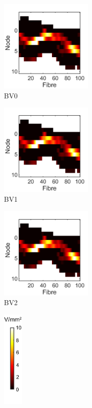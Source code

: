 \begin{figure}
	\centering
	
	\begin{subfigure}[t]{0.3\textwidth}
        \centering
        \includegraphics[height=4.5cm]{Simulations/Vasculature/2D-AF-BV-noBV}
        \caption{BV0}
        \label{fig:vasc_af_noBV}
    \end{subfigure}%
	\begin{subfigure}[t]{0.3\textwidth}
        \centering
        \includegraphics[height=4.5cm]{Simulations/Vasculature/2D-AF-BV-mainBV}
        \caption{BV1}
        \label{fig:vasc_af_mainBV}
    \end{subfigure}%
	\begin{subfigure}[t]{0.3\textwidth}
        \centering
        \includegraphics[height=4.5cm]{Simulations/Vasculature/2D-AF-BV-allBV}
        \caption{BV2}
        \label{fig:vasc_af_allBV}
    \end{subfigure}%
    \begin{subfigure}[t]{0.09\textwidth}
        \centering
        \includegraphics[height=4.77cm]{Simulations/Vasculature/cbar_af_abs}
        \label{fig:vasc_af_noBV_cbar}
    \end{subfigure}\\%
    

\end{figure}
